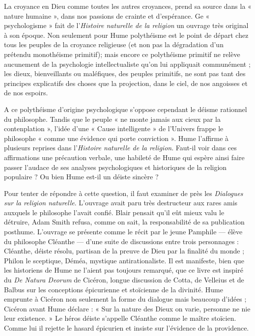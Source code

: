 La croyance en Dieu comme toutes les autres croyances,
prend sa source dans la « nature humaine », dans nos
passions de crainte et d'espérance. Ge « psychologisme »
fait de l'{\it Histoire naturelle de la religion} un ouvrage très
original à son époque. Non seulement pour Hume 
polythéisme est le point de départ chez tous les peuples
de la croyance religieuse (et non pas la dégradation d’un
prétendu monothéisme primitif); mais encore ce polythéisme
primitif ne relève aucunement de la psychologie
intellectualiste qu’on lui appliquait communément ; les
dieux, bienveillants ou maléfiques, des peuples primitifs,
ne sont pas tant des principes explicatifs des choses que
la projection, dans le ciel, de nos angoisses et de nos espoirs.

A ce polythéisme d’origine psychologique s'oppose
cependant le déisme rationnel du philosophe. Tandis que
le peuple « ne monte jamais aux cieux par la contenplation »,
l’idée d’une « Cause intelligente » de l'Univers
frappe le philosophe « comme une évidence qui porte
conviction ». Hume l’affirme à plusieurs reprises dans
l'{\it Histoire naturelle de la religion}. Faut-il voir dans ces
affirmations une précaution verbale, une habileté de Hume
qui espère ainsi faire passer l'audace de ses analyses psychologiques
et historiques de la religion populaire ? Ou
bien Hume est-il un déiste sincère ?

Pour tenter de répondre à cette question, il faut examiner
de près les {\it Dialogues sur la religion naturelle}. L'ouvrage
avait paru très destructeur aux rares amis auxquels le
philosophe l’avait confié. Blair pensait qu’il eût mieux
valu le détruire, Adam Smith refusa, comme on sait, la
responsabilité de sa publication posthume. L'ouvrage se
présente comme le récit par le jeune Pamphile — élève
du philosophe Cléanthe — d’une suite de discussions entre
trois personnages : Cléanthe, déiste résolu, partisan de la
preuve de Dieu par la finalité du monde ; Philon le sceptique,
Déméa, mystique antirationaliste. Il est manifeste,
bien que les historiens de Hume ne l’aient pas toujours
remarqué, que ce livre est inspiré du {\it De Natura Deorum}
de Cicéron, longue discussion de Cotta, de Velleius et de
Balbus sur les conceptions épicurienne et stoïcienne de la
divinité. Hume emprunte à Cicéron non seulement la
forme du dialogue mais beaucoup d’idées ; Cicéron avant
Hume déclare : « Sur la nature des Dieux on varie, personne ne
nie leur existence. » Le héros déiste s’appelle
Cléanthe comme le maître stoïcien. Comme lui il rejette
le hasard épicurien et insiste sur l’évidence de la providence.

